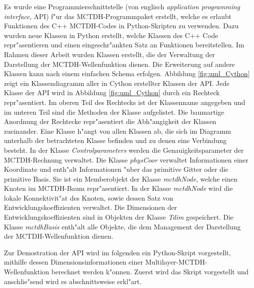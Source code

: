 Es wurde eine Programmierschnittstelle (von englisch \textit{application programming interface}, API) f"ur das MCTDH-Programmpaket erstellt,
welche es erlaubt Funktionen des C++ MCTDH-Codes in Python-Skripten zu verwenden.
Dazu wurden neue Klassen in Python erstellt, welche Klassen des C++ Code repr"asentieren 
und einen eingeschr"ankten Satz an Funktionen bereitstellen.
Im Rahmen dieser Arbeit wurden Klassen erstellt, die der Verwaltung der Darstellung der MCTDH-Wellenfunktion dienen.
Die Erweiterung auf andere Klassen kann nach einem einfachen Schema erfolgen.
Abbildung \ref{fig:uml_Cython} zeigt ein Klassendiagramm aller in Cython erstellter Klassen der API.
Jede Klasse der API wird in Abbildung \ref{fig:uml_Cython} durch ein Rechteck repr"asentiert.
Im oberen Teil des Rechtecks ist der Klassenname angegeben und im unteren Teil sind die Methoden der Klasse aufgelistet.
Die baumartige Anordnung der Rechtecke repr"asentiert die Abh"angigkeit der Klassen zueinander. Eine Klasse h"angt von
allen Klassen ab, die sich im Diagramm unterhalb der betrachteten Klasse befinden und zu denen eine Verbindung besteht.
In der Klasse \textit{Controlparameters} werden die Genauigkeitsparameter der MCTDH-Rechnung verwaltet. 
Die Klasse \textit{physCoor} verwaltet Informationen einer Koordinate und enth"alt Informationen "uber das primitive Gitter oder
die primitive Basis. Sie ist ein Memberobjekt der Klasse \textit{mctdhNode}, welche einen Knoten im MCTDH-Baum 
repr"asentiert. In der Klasse \textit{mctdhNode} wird die lokale Konnektivit"at des Knoten, sowie dessen Satz von
Entwicklungskoeffizienten verwaltet. Die Dimensionen der Entwicklungskoeffizienten sind in Objekten der Klasse
\textit{Tdim} gespeichert. Die Klasse \textit{mctdhBasis} enth"alt alle Objekte, die dem Management der Darstellung der
MCTDH-Wellenfunktion dienen.

Zur Demostration der API wird im folgenden ein Python-Skript vorgestellt, mithilfe dessen Dimensionsinformationen
einer Multilayer-MCTDH-Wellenfunktion berechnet werden k"onnen. Zuerst wird das Skript vorgestellt und 
anschlie"send wird es abschnittsweise erkl"art.

\newpage

